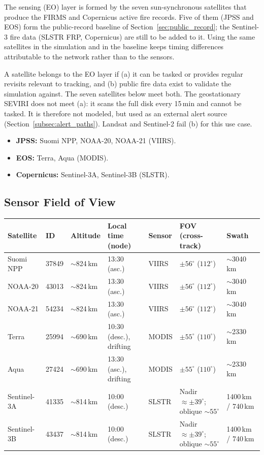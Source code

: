 \documentclass[11pt]{article}
\begin{document}
The sensing (EO) layer is formed by the seven sun-synchronous satellites that produce the FIRMS and Copernicus active fire records. Five of them (JPSS and EOS) form the public-record baseline of Section~\ref{sec:public_record}; the Sentinel-3 fire data (SLSTR FRP, Copernicus) are still to be added to it. Using the same satellites in the simulation and in the baseline keeps timing differences attributable to the network rather than to the sensors.

A satellite belongs to the EO layer if (a) it can be tasked or provides regular revisits relevant to tracking, and (b) public fire data exist to validate the simulation against. The seven satellites below meet both. The geostationary SEVIRI does not meet (a): it scans the full disk every 15\,min and cannot be tasked. It is therefore not modeled, but used as an external alert source (Section~\ref{subsec:alert_paths}). Landsat and Sentinel-2 fail (b) for this use case.

\begin{itemize}[leftmargin=1.2cm]
    \item \textbf{JPSS:} Suomi NPP, NOAA-20, NOAA-21 (VIIRS).
    \item \textbf{EOS:} Terra, Aqua (MODIS).
    \item \textbf{Copernicus:} Sentinel-3A, Sentinel-3B (SLSTR).
\end{itemize}

\subsection{Sensor Field of View}\label{subsec:fov}

\begin{longtable}{p{2.0cm}p{1.2cm}p{1.6cm}p{2.0cm}p{1.3cm}p{2.6cm}p{2.0cm}}
\toprule
\textbf{Satellite} & \textbf{ID} & \textbf{Altitude} & \textbf{Local time (node)} & \textbf{Sensor} & \textbf{FOV (cross-track)} & \textbf{Swath} \\
\midrule
\endhead
Suomi NPP & 37849 & $\sim$824\,km & 13:30 (asc.) & VIIRS & $\pm 56^\circ$ ($112^\circ$) & $\sim$3040\,km \\
NOAA-20 & 43013 & $\sim$824\,km & 13:30 (asc.) & VIIRS & $\pm 56^\circ$ ($112^\circ$) & $\sim$3040\,km \\
NOAA-21 & 54234 & $\sim$824\,km & 13:30 (asc.) & VIIRS & $\pm 56^\circ$ ($112^\circ$) & $\sim$3040\,km \\
Terra & 25994 & $\sim$690\,km & 10:30 (desc.), drifting & MODIS & $\pm 55^\circ$ ($110^\circ$) & $\sim$2330\,km \\
Aqua & 27424 & $\sim$690\,km & 13:30 (asc.), drifting & MODIS & $\pm 55^\circ$ ($110^\circ$) & $\sim$2330\,km \\
Sentinel-3A & 41335 & $\sim$814\,km & 10:00 (desc.) & SLSTR & Nadir $\approx \pm 39^\circ$; oblique $\sim 55^\circ$ & 1400\,km / 740\,km \\
Sentinel-3B & 43437 & $\sim$814\,km & 10:00 (desc.) & SLSTR & Nadir $\approx \pm 39^\circ$; oblique $\sim 55^\circ$ & 1400\,km / 740\,km \\
\bottomrule
\end{longtable}
\end{document}
